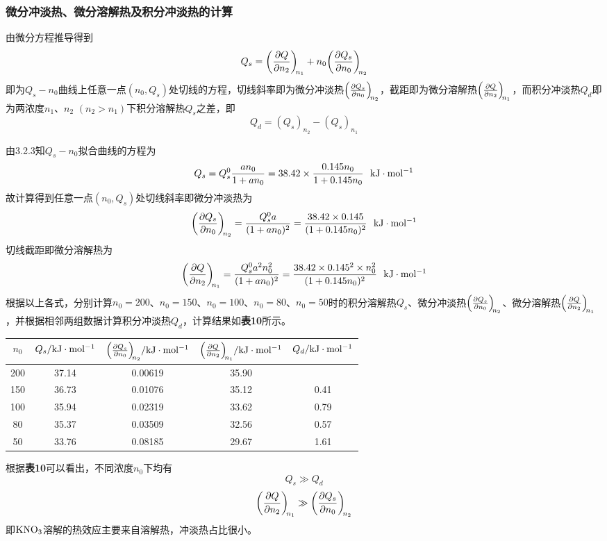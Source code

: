 \documentclass[12pt]{article}
\begin{document}
\subsubsection{微分冲淡热、微分溶解热及积分冲淡热的计算}
由微分方程推导得到
$$
Q_{s}=\diffp Q{n_{2}}[n_{1}]+n_{0}\diffp {Q_{s}}{n_{0}}[n_{2}]
$$
即为$Q_{s}-n_{0}$曲线上任意一点$(n_{0}, Q_{s})$处切线的方程，切线斜率即为微分冲淡热$\diffp {Q_{s}}{n_{0}}[n_{2}]$，截距即为微分溶解热$\diffp Q{n_{2}}[n_{1}]$，而积分冲淡热$Q_{d}$即为两浓度$n_{1}$、$n_{2}$ $(n_{2}>n_{1})$下积分溶解热$Q_{s}$之差，即
$$
Q_{d}=(Q_{s})_{n_{2}}-(Q_{s})_{n_{1}}
$$
\par 
由3.2.3知$Q_{s}-n_{0}$拟合曲线的方程为
$$
Q_{s} =Q^{0}_{s}\frac{an_{0}}{1+an_{0}}= 38.42\times \frac{0.145 n_{0}}{1+0.145 n_{0}}\ \ {\rm kJ\cdot mol^{-1}}
$$
故计算得到任意一点$(n_{0}, Q_{s})$处切线斜率即微分冲淡热为
$$
\diffp {Q_{s}}{n_{0}}[n_{2}]=\frac{Q^{0}_{s}a}{(1+an_{0})^{2}}=\frac{38.42\times 0.145}{(1+0.145n_{0})^{2}}\ \ {\rm kJ\cdot mol^{-1}}
$$
切线截距即微分溶解热为
$$
\diffp Q{n_{2}}[n_{1}]=\frac{Q^{0}_{s}a^{2}n^{2}_{0}}{(1+an_{0})^{2}}=\frac{38.42\times 0.145^{2} \times n^{2}_{0}}{(1+0.145n_{0})^{2}}\ \ {\rm kJ\cdot mol^{-1}}
$$
根据以上各式，分别计算$n_{0}=200$、$n_{0}=150$、$n_{0}=100$、$n_{0}=80$、$n_{0}=50$时的积分溶解热$Q_{s}$、微分冲淡热$\diffp {Q_{s}}{n_{0}}[n_{2}]$、微分溶解热$\diffp Q{n_{2}}[n_{1}]$，并根据相邻两组数据计算积分冲淡热$Q_{d}$，计算结果如\textbf{表10}所示。
\begin{table}[h]
	\centering
	\begin{tabular}{ccccc}
		\toprule
		$n_{0}$ &  $Q_{s}/{\rm kJ\cdot mol^{-1}}$ & $\diffp {Q_{s}}{n_{0}}[n_{2}]/{\rm kJ\cdot mol^{-1}}$ & $ \diffp Q{n_{2}}[n_{1}]/{\rm kJ\cdot mol^{-1}}$ & $Q_{d}/{\rm kJ\cdot mol^{-1}}$ \\
		\midrule
		200 & 37.14 & 0.00619 & 35.90 &      \\
		150 & 36.73 & 0.01076 & 35.12 & 0.41 \\
		100 & 35.94 & 0.02319 & 33.62 & 0.79 \\
		80  & 35.37 & 0.03509 & 32.56 & 0.57 \\
		50  & 33.76 & 0.08185 & 29.67 & 1.61 \\
		\bottomrule
	\end{tabular}
\end{table}
\par
根据\textbf{表10}可以看出，不同浓度$n_{0}$下均有
$$
Q_{s}\gg Q_{d}
$$
$$
\diffp Q{n_{2}}[n_{1}]\gg \diffp {Q_{s}}{n_{0}}[n_{2}]
$$
即$\rm KNO_{3}$溶解的热效应主要来自溶解热，冲淡热占比很小。
\end{document}
